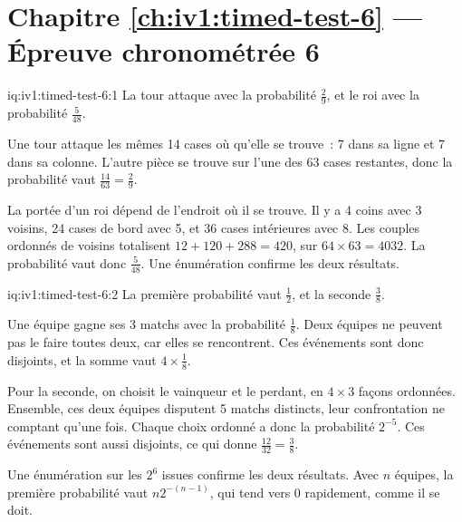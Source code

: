 \section*{Chapitre \ref{ch:iv1:timed-test-6} --- Épreuve chronométrée 6}

\begin{solution}{iq:iv1:timed-test-6:1}
La tour attaque avec la probabilité $\frac29$, et le roi avec la probabilité $\frac{5}{48}$.

Une tour attaque les mêmes 14 cases où qu'elle se trouve~: 7 dans sa ligne et 7 dans sa colonne. L'autre pièce se trouve sur l'une des 63 cases restantes, donc la probabilité vaut $\frac{14}{63} = \frac29$.

La portée d'un roi dépend de l'endroit où il se trouve. Il y a 4 coins avec 3 voisins, 24 cases de bord avec 5, et 36 cases intérieures avec 8. Les couples ordonnés de voisins totalisent $12 + 120 + 288 = 420$, sur $64 \times 63 = 4032$. La probabilité vaut donc $\frac{5}{48}$. Une énumération confirme les deux résultats.

\end{solution}

\begin{solution}{iq:iv1:timed-test-6:2}
La première probabilité vaut $\frac12$, et la seconde $\frac38$.

Une équipe gagne ses 3 matchs avec la probabilité $\frac18$. Deux équipes ne peuvent pas le faire toutes deux, car elles se rencontrent. Ces événements sont donc disjoints, et la somme vaut $4 \times \frac18$.

Pour la seconde, on choisit le vainqueur et le perdant, en $4 \times 3$ façons ordonnées. Ensemble, ces deux équipes disputent 5 matchs distincts, leur confrontation ne comptant qu'une fois. Chaque choix ordonné a donc la probabilité $2^{-5}$. Ces événements sont aussi disjoints, ce qui donne $\frac{12}{32} = \frac38$.

Une énumération sur les $2^6$ issues confirme les deux résultats. Avec $n$ équipes, la première probabilité vaut $n2^{-(n - 1)}$, qui tend vers 0 rapidement, comme il se doit.

\end{solution}

